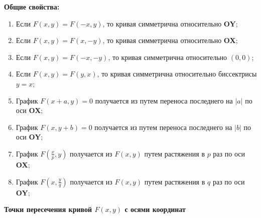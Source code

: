                \textbf{Общие свойства:}

                    \begin{enumerate}
                        \item Если $F \left( x, y \right) = F \left( - x, y \right)$, то кривая симметрична относительно \textbf{OY};

                        \item Если $F \left( x, y \right) = F \left( x, - y \right)$, то кривая симметрична относительно \textbf{OX};

                        \item Если $F \left( x, y \right) = F \left( - x, - y \right)$, то кривая симметрична относительно $\left( 0, 0 \right)$;

                        \item Если $F \left( x, y \right) = F \left( y, x \right)$, то кривая симметрична относительно биссектрисы $y = x$;

                        \item График $F \left( x + a, y \right) = 0$ получается из  путем переноса последнего на $\left| a \right|$ по оси \textbf{OX};

                        \item График $F \left( x, y  + b \right) = 0$ получается из  путем переноса последнего на $\left| b \right|$ по оси \textbf{OY};

                        \item График $F \left( \frac{x}{p}, y \right)$ получается из $F \left( x, y \right)$  путем растяжения в $p$ раз по оси \textbf{OX};

                        \item График $F \left( x, \frac{y}{q} \right)$ получается из $F \left( x, y \right)$  путем растяжения в $q$ раз по оси \textbf{OY};
                    \end{enumerate}

                \textbf{Точки пересечения кривой $F \left( x, y \right)$ с осями координат}

